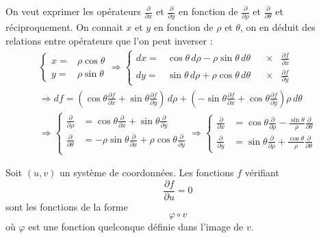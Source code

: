 \begin{exple}
 On veut exprimer les opérateurs $\frac{\partial }{\partial x}$ et $\frac{\partial }{\partial y}$ en fonction de $\frac{\partial }{\partial \rho}$ et $\frac{\partial }{\partial \theta}$ et réciproquement.\newline
On connait $x$ et $y$ en fonction de $\rho$ et $\theta$, on en déduit des relations entre opérateurs que l'on peut inverser :
\begin{multline*}
 \left\lbrace
\begin{aligned}
 x =& \rho \cos \theta \\
 y =& \rho \sin \theta 
\end{aligned}
 \right. 
\Rightarrow
 \left\lbrace
\begin{aligned}
 dx =& \cos \theta \,d\rho  -\rho\sin \theta \,d\theta & &\times &\frac{\partial f}{\partial x}\\
 dy =& \sin \theta \,d\rho  +\rho\cos \theta \,d\theta & &\times &\frac{\partial f}{\partial y}
\end{aligned}
 \right. \\
\Rightarrow
df  = 
\left(\cos\theta\frac{\partial f}{\partial x}+ \sin\theta\frac{\partial f}{\partial y}\right) \,d\rho
 +
\left(-\sin\theta\frac{\partial f}{\partial x}+ \cos\theta\frac{\partial f}{\partial y} \right)\rho \,d\theta
\\ \Rightarrow
\left\lbrace 
\begin{aligned}
\frac{\partial }{\partial \rho} &= 
\cos\theta\frac{\partial }{\partial x}+ \sin\theta\frac{\partial }{\partial y} \\
\frac{\partial }{\partial \theta} &= 
-\rho \sin\theta\frac{\partial }{\partial x}+ \rho\cos\theta\frac{\partial }{\partial y} \\
\end{aligned}
\right. 
\Rightarrow
\left\lbrace 
\begin{aligned}
\frac{\partial }{\partial x} &= 
\cos\theta\frac{\partial }{\partial \rho} - \frac{\sin\theta}{\rho}\frac{\partial }{\partial \theta} \\
\frac{\partial }{\partial y} &= 
\sin\theta\frac{\partial }{\partial \rho} + \frac{\cos\theta}{\rho}\frac{\partial }{\partial \theta}
\end{aligned}
\right.
\end{multline*}
\end{exple}
\begin{exple}
 Soit $(u,v)$ un système de coordonnées. Les fonctions $f$ vérifiant
\begin{displaymath}
 \frac{\partial f}{\partial u}= 0
\end{displaymath}
sont les fonctions de la forme
\begin{displaymath}
 \varphi \circ v
\end{displaymath}
où $\varphi$ est une fonction quelconque définie dans l'image de $v$.
\end{exple}

